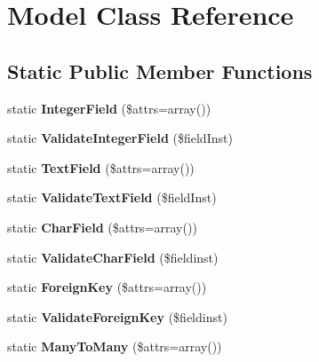 \hypertarget{classModel}{\section{Model Class Reference}
\label{classModel}
}
\subsection*{Static Public Member Functions}
\begin{DoxyCompactItemize}
\item 
\hypertarget{classModel_ab9216a19669cfe36185f2708614b3f3b}{static {\bfseries Integer\-Field} (\$attrs=array())}\label{classModel_ab9216a19669cfe36185f2708614b3f3b}

\item 
\hypertarget{classModel_a816f494f0a76785786665c500ef957c3}{static {\bfseries Validate\-Integer\-Field} (\$field\-Inst)}\label{classModel_a816f494f0a76785786665c500ef957c3}

\item 
\hypertarget{classModel_a60ca6a2e46ac811b5e48de736fe7a9e6}{static {\bfseries Text\-Field} (\$attrs=array())}\label{classModel_a60ca6a2e46ac811b5e48de736fe7a9e6}

\item 
\hypertarget{classModel_a736897403db67297bc3eb89076858224}{static {\bfseries Validate\-Text\-Field} (\$field\-Inst)}\label{classModel_a736897403db67297bc3eb89076858224}

\item 
\hypertarget{classModel_ad309e7380233caa60a452a835d6efd79}{static {\bfseries Char\-Field} (\$attrs=array())}\label{classModel_ad309e7380233caa60a452a835d6efd79}

\item 
\hypertarget{classModel_ae825ee44bd2b96749b4cdc9f7749c036}{static {\bfseries Validate\-Char\-Field} (\$fieldinst)}\label{classModel_ae825ee44bd2b96749b4cdc9f7749c036}

\item 
\hypertarget{classModel_aef711c224262aeae7d118247bc63ac94}{static {\bfseries Foreign\-Key} (\$attrs=array())}\label{classModel_aef711c224262aeae7d118247bc63ac94}

\item 
\hypertarget{classModel_a0059b7ec64cc31e4bb8f8bc9ff6bd5b1}{static {\bfseries Validate\-Foreign\-Key} (\$fieldinst)}\label{classModel_a0059b7ec64cc31e4bb8f8bc9ff6bd5b1}

\item 
\hypertarget{classModel_a3f4ddd94949057b39165ef27a1a8e1a6}{static {\bfseries Many\-To\-Many} (\$attrs=array())}\label{classModel_a3f4ddd94949057b39165ef27a1a8e1a6}


\end{DoxyCompactItemize}
